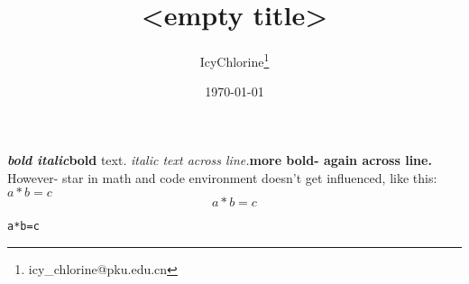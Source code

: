 \documentclass[UTF8]{ctexart}
\title{<empty title>}
\author{IcyChlorine\footnote{icy\_chlorine@pku.edu.cn}}
\date{\today}
\begin{document}
	\maketitle
\textbf{\emph{bold italic}}\textbf{bold} text. \emph{italic
text across line.}\textbf{more bold-
again across line.} However- star in math and code environment doesn't get influenced, like this:
$a*b=c$
$$
a*b=c
$$
\begin{lstlisting}
a*b=c
\end{lstlisting}
\end{document}
